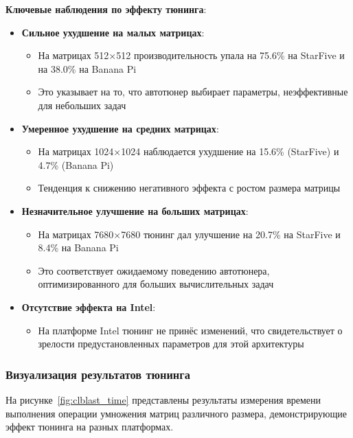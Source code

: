 \textbf{Ключевые наблюдения по эффекту тюнинга}:

\begin{itemize}
    \item \textbf{Сильное ухудшение на малых матрицах}: 
    \begin{itemize}
        \item На матрицах 512×512 производительность упала на 75.6\% на StarFive и на 38.0\% на Banana Pi
        \item Это указывает на то, что автотюнер выбирает параметры, неэффективные для небольших задач
    \end{itemize}
    
    \item \textbf{Умеренное ухудшение на средних матрицах}:
    \begin{itemize}
        \item На матрицах 1024×1024 наблюдается ухудшение на 15.6\% (StarFive) и 4.7\% (Banana Pi)
        \item Тенденция к снижению негативного эффекта с ростом размера матрицы
    \end{itemize}
    
    \item \textbf{Незначительное улучшение на больших матрицах}:
    \begin{itemize}
        \item На матрицах 7680×7680 тюнинг дал улучшение на 20.7\% на StarFive и 8.4\% на Banana Pi
        \item Это соответствует ожидаемому поведению автотюнера, оптимизированного для больших вычислительных задач
    \end{itemize}
    
    \item \textbf{Отсутствие эффекта на Intel}:
    \begin{itemize}
        \item На платформе Intel тюнинг не принёс изменений, что свидетельствует о зрелости предустановленных параметров для этой архитектуры
    \end{itemize}
\end{itemize}

\subsubsection{Визуализация результатов тюнинга}

На рисунке~\ref{fig:clblast_time} представлены результаты измерения времени выполнения операции умножения матриц различного размера, демонстрирующие эффект тюнинга на разных платформах.

